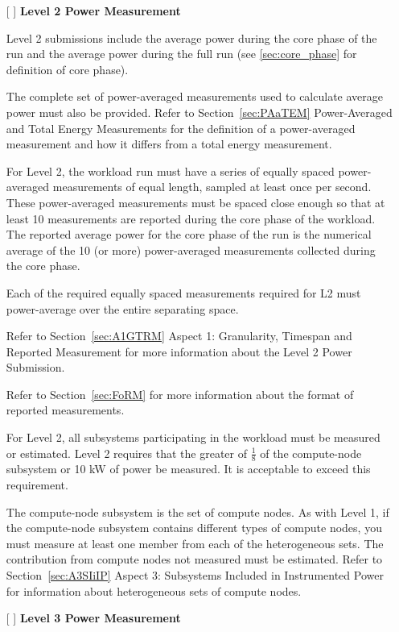 \begin{itemize}
\newpage
\item[{[ ]}]
\textbf{Level 2 Power Measurement}

Level 2 submissions include the average power during the core phase of the run and the average power during the full run (see \ref{sec:core_phase} for definition of core phase).

The complete set of power-averaged measurements used to calculate average power must also be provided. 
Refer to Section~\ref{sec:PAaTEM} Power-Averaged and Total Energy Measurements for the definition of a power-averaged
measurement and how it differs from a total energy measurement.

For Level 2, the workload run must have a series of equally spaced power-averaged measurements of equal length, sampled at least once per second.
These power-averaged measurements must be spaced close enough so that at least 10 measurements are reported during the
core phase of the workload. The reported average power for the core phase of the run is the numerical average of the
10 (or more) power-averaged measurements collected during the core phase.

Each of the required equally spaced measurements required for L2 must power-average over the entire separating space. 

Refer to Section~\ref{sec:A1GTRM} Aspect 1: Granularity, Timespan and Reported Measurement for more information about the Level 2 Power Submission. 

Refer to Section~\ref{sec:FoRM} for more information about the format of reported measurements.

For Level 2, all subsystems participating in the workload must be measured or estimated. Level 2 requires that the 
greater of $ \frac{1}{8} $ of the compute-node subsystem or 10 kW of power be measured. It is acceptable to exceed this requirement.

The compute-node subsystem is the set of compute nodes. As with Level 1, if the compute-node subsystem contains different types of compute nodes, you must measure at least one member from each of the heterogeneous sets. The contribution from compute nodes not measured must be estimated. Refer to Section~\ref{sec:A3SIiIP} Aspect 3: Subsystems Included in Instrumented Power for information about heterogeneous sets of compute nodes.

\newpage
\item[{[ ]}]
\textbf{Level 3 Power Measurement}


\end{itemize}
